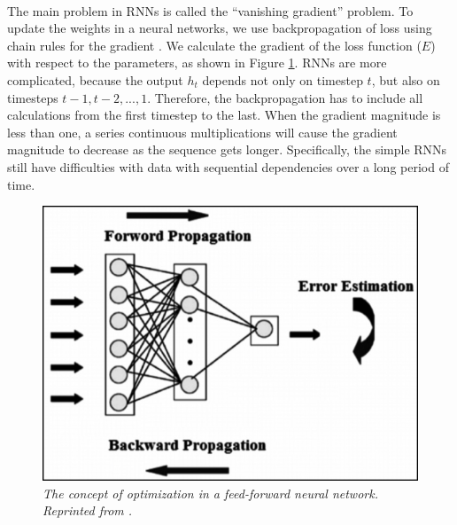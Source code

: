 \paragraph{}
The main problem in RNNs is called the ``vanishing gradient'' problem. To update the weights in a neural networks, we use backpropagation of loss using chain rules for the gradient \cite{arnx_2019}. We calculate the gradient of the loss function ($E$) with respect to the parameters, as shown in Figure \ref{fig:bpp}. RNNs are more complicated, because the output $h_t$ depends not only on timestep $t$, but also on timesteps $t-1, t-2, ..., 1$. Therefore, the backpropagation has to include all calculations from the first timestep to the last. When the gradient magnitude is less than one, a series continuous multiplications will cause the gradient magnitude to decrease as the sequence gets longer. Specifically, the simple RNNs still have difficulties with data with sequential dependencies over a long period of time.

\begin{figure}[H]
  \centering
  \caption[The concept of optimization in a feed-forward neural network.]{\emph{The concept of optimization in a feed-forward neural network. \\Reprinted from \citeauthor{donges_2019}. \citeyear{donges_2019}}}\label{fig:bpp}
  \includegraphics[scale = 0.4]{figures/bpp.jpg}  
\end{figure}

